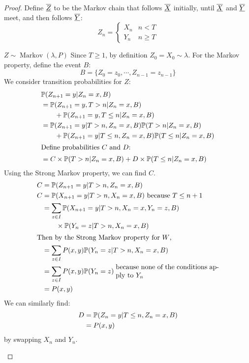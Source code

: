 \documentclass[../Main.tex]{subfiles}
\begin{document}
\begin{proof}
    Define $\chain{Z}$ to be the Markov chain that follows $\chain{X}$ initially, until $\chain{X}$ and $\chain{Y}$ meet, and then follows $\chain{Y}$:
    \begin{equation*}
        Z_n = \begin{cases}
            X_n & n < T \\
            Y_n & n \geq T
        \end{cases}
    \end{equation*}
    \begin{subproof}{$Z \sim \operatorname{Markov}(\lambda, P)$}
        Since $T \geq 1$, by definition $Z_0 = X_0 \sim \lambda$.
        For the Markov property, define the event $B$:
        \begin{equation*}
            B = \{Z_0 = z_0, \cdots, Z_{n-1} = z_{n-1}\}
        \end{equation*}
        We consider transition probabilities for $Z$:
        \begin{align*}
            &\P(Z_{n+1} = y | Z_n = x, B) \\
            &= \P(Z_{n+1} = y, T > n | Z_n = x, B)\\
                &\qquad+ \P(Z_{n+1} = y, T \leq n | Z_n = x, B) \\
            &= \P(Z_{n+1} = y | T > n, Z_n = x, B) \P(T > n | Z_n = x, B) \\
                &\qquad+ \P(Z_{n+1} = y | T \leq n, Z_n = x, B) \P(T \leq n | Z_n = x, B) \\
            \intertext{Define probabilities $C$ and $D$:}
            &= C \times \P(T > n | Z_n = x, B) + D \times \P(T \leq n | Z_n = x, B)
        \end{align*}
        Using the Strong Markov property, we can find $C$.
        \begin{align*}
            C &= \P(Z_{n+1} = y | T > n, Z_n = x, B)\\
            C &= \P(X_{n+1} = y | T > n, X_n = x, B) \text{ because $T \leq n+1$} \\
            &= \sum_{z \in I} \P(X_{n+1} = y | T > n, X_n = x, Y_n = z, B) \\
                &\qquad\times \P(Y_n = z | T > n, X_n = x, B)\\
            \intertext{Then by the Strong Markov property for $W$,}
            &= \sum_{z \in I} P(x, y) \P(Y_n = z | T > n, X_n = x, B)\\
            &= \sum_{z \in I} P(x, y) \P(Y_n = z)\;\parbox{15em}{because none of the conditions apply to $Y_n$}\\
            &= P(x, y)
        \end{align*}
        We can similarly find:
        \begin{align*}
            D &= \P(Z_n = y | T \leq n, Z_n = x, B)\\
            &= P(x, y)
        \end{align*}
        by swapping $X_n$ and $Y_n$.


\end{subproof}
\end{proof}
\end{document}
